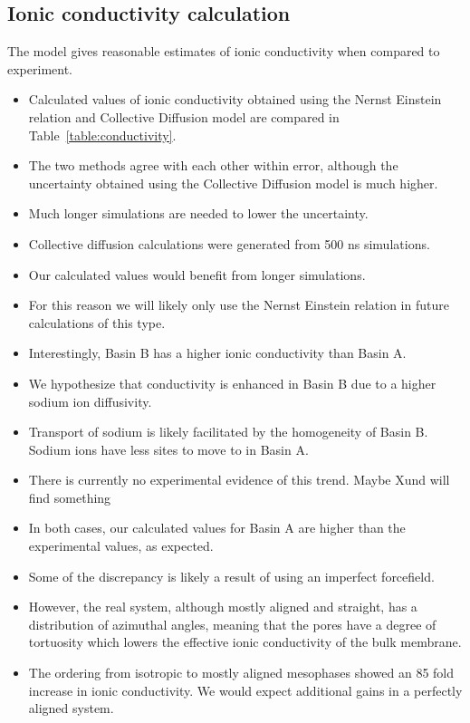 \documentclass{article}
\begin{document}
  \subsection*{Ionic conductivity calculation}

  The model gives reasonable estimates of ionic conductivity when compared to 
  experiment.
  \begin{itemize}
  	\item Calculated values of ionic conductivity obtained using the Nernst 
	Einstein relation and Collective Diffusion model are compared in 
	Table~\ref{table:conductivity}.
	\item The two methods agree with each other within error, although the 
	uncertainty obtained using the Collective Diffusion model is much higher.
	\item Much longer simulations are needed to lower the uncertainty. %
	\item Collective diffusion calculations were generated from 
	500 ns simulations.
	\item Our calculated values would benefit from longer simulations. 
	\item For this reason we will likely only use the Nernst Einstein relation
	in future calculations of this type. 
	\item Interestingly, Basin B has a higher ionic conductivity than Basin A.
	\item We hypothesize that conductivity is enhanced in Basin B due to a 
	higher sodium ion diffusivity.
	\item Transport of sodium is likely facilitated by the homogeneity of Basin B.
	Sodium ions have less sites to move to in Basin A.
	\item There is currently no experimental evidence of this trend. Maybe Xund will find something
	\item In both cases, our calculated values for Basin A are higher than the 
	experimental values, as expected. 
	\item Some of the discrepancy is likely a result of using an imperfect forcefield. 
	\item However, the real system, although mostly aligned and straight, has a 
	distribution of azimuthal angles, meaning that the pores have a degree of 
	tortuosity which lowers the effective ionic conductivity of the bulk membrane. 
	\item The ordering from isotropic to mostly aligned mesophases showed an 85 
	fold increase in ionic conductivity. We would expect additional gains in a 
	perfectly aligned system.
  \end{itemize}
	
\end{document}
